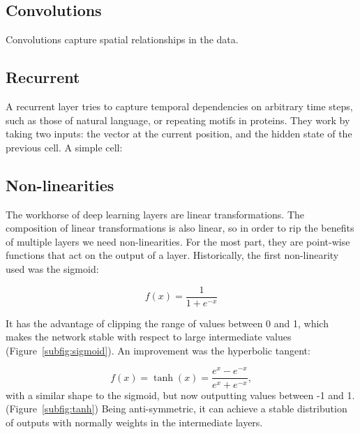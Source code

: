 \subsection{Convolutions}
Convolutions capture spatial relationships in the data.

\subsection{Recurrent}
A recurrent layer tries to capture temporal dependencies on arbitrary time steps, such as those of natural language, or repeating motifs in proteins.
They work by taking two inputs: the vector at the current position, and the hidden state of the previous cell.
A simple cell:


\subsection{Non-linearities}
The workhorse of deep learning layers are linear transformations.
The composition of linear transformations is also linear, so in order to rip the benefits of multiple layers we need non-linearities.
For the most part, they are point-wise functions that act on the output of a layer.
Historically, the first non-linearity used was the sigmoid:

\begin{equation*}
f(x) = \frac{1}{1 + e^{- x}}
\end{equation*}

It has the advantage of clipping the range of values between 0 and 1, which makes the network stable with respect to large intermediate values (Figure~\ref{subfig:sigmoid}).
An improvement was the hyperbolic tangent:

\begin{equation*}
f(x) = \tanh(x) = \frac{e^x - e^{-x}}{e^x + e^{-x}},
\end{equation*}
with a similar shape to the sigmoid, but now outputting values between -1 and 1. (Figure~\ref{subfig:tanh})
Being anti-symmetric, it can achieve a stable distribution of outputs with normally weights in the intermediate layers.

